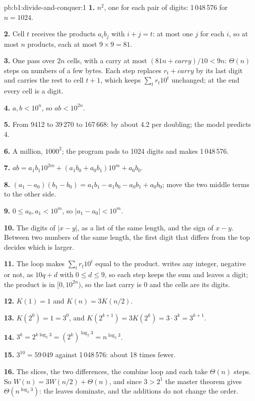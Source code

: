 \begin{solution}{pb:b1:divide-and-conquer:1}
\textbf{1.} $n^2$, one for each pair of digits: 1\,048\,576 for $n = 1024$.

\textbf{2.} Cell $t$ receives the products $a_i b_j$ with $i + j = t$: at most one $j$ for each $i$, so at most $n$
products, each at most $9 \times 9 = 81$.

\textbf{3.} One pass over $2n$ cells, with a carry at most $(81n + \mathit{carry})/10 < 9n$: $\Theta(n)$ steps on
numbers of a few bytes. Each step replaces $r_t + \mathit{carry}$ by its last digit and carries the rest to cell $t + 1$,
which keeps $\sum_t r_t 10^t$ unchanged; at the end every cell is a digit.

\textbf{4.} $a, b < 10^n$, so $ab < 10^{2n}$.

\textbf{5.} From 9412 to 39\,270 to 167\,668: by about 4.2 per doubling; the model predicts 4.

\textbf{6.} A million, $1000^2$; the program pads to 1024 digits and makes 1\,048\,576.

\textbf{7.} $ab = a_1 b_1 10^{2m} + (a_1 b_0 + a_0 b_1) 10^m + a_0 b_0$.

\textbf{8.} $(a_1 - a_0)(b_1 - b_0) = a_1 b_1 - a_1 b_0 - a_0 b_1 + a_0 b_0$; move the two middle terms to the other side.

\textbf{9.} $0 \leq a_0, a_1 < 10^m$, so $|a_1 - a_0| < 10^m$.

\textbf{10.} The digits of $|x - y|$, as a list of the same length, and the sign of $x - y$. Between two numbers of the
same length, the first digit that differs from the top decides which is larger.

\textbf{11.} The loop makes $\sum_t r_t 10^t$ equal to the product.  writes any integer, negative or not, as
$10q + d$ with $0 \leq d \leq 9$, so each step keeps the sum and leaves a digit; the product is in $[0, 10^{2n})$, so
the last carry is 0 and the cells are its digits.

\textbf{12.} $K(1) = 1$ and $K(n) = 3K(n/2)$.

\textbf{13.} $K(2^0) = 1 = 3^0$, and $K(2^{k+1}) = 3K(2^k) = 3 \cdot 3^k = 3^{k+1}$.

\textbf{14.} $3^k = 2^{k \log_2 3} = (2^k)^{\log_2 3} = n^{\log_2 3}$.

\textbf{15.} $3^{10} = 59\,049$ against 1\,048\,576: about 18 times fewer.

\textbf{16.} The slices, the two differences, the combine loop and  each take $\Theta(n)$ steps. So
$W(n) = 3W(n/2) + \Theta(n)$, and since $3 > 2^1$ the master theorem gives $\Theta(n^{\log_2 3})$: the leaves dominate,
and the additions do not change the order.


\end{solution}
